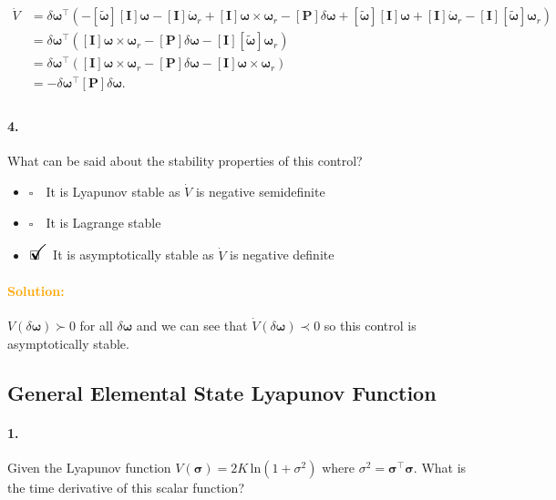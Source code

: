 \documentclass[12pt, a4paper]{article}
\newcommand{\ans}{\item[]$\rlap{\LARGE{\checkmark}}\square\quad$}
\newcommand{\noans}{\item[]$\square\quad$}
\begin{document}
\begin{equation*}
    \begin{split}
        \dot{V}&=\delta\bm{\omega}^{\intercal}(-[\tilde{\bm{\omega}}][\bm{I}]\bm{\omega}-[\bm{I}]\dot{\bm{\omega}}_{r}+[\bm{I}]\bm{\omega}\times\bm{\omega}_{r}-[\bm{P}]\delta\bm{\omega}+[\tilde{\bm{\omega}}][\bm{I}]\bm{\omega}+[\bm{I}]\dot{\bm{\omega}}_{r}-[\bm{I}][\tilde{\bm{\omega}}]\bm{\omega}_{r})\\
        &=\delta\bm{\omega}^{\intercal}([\bm{I}]\bm{\omega}\times\bm{\omega}_{r}-[\bm{P}]\delta\bm{\omega}-[\bm{I}][\tilde{\bm{\omega}}]\bm{\omega}_{r})\\
        &=\delta\bm{\omega}^{\intercal}([\bm{I}]\bm{\omega}\times\bm{\omega}_{r}-[\bm{P}]\delta\bm{\omega}-[\bm{I}]\bm{\omega}\times\bm{\omega}_{r})\\
        &=-\delta\bm{\omega}^{\intercal}[\bm{P}]\delta\bm{\omega}.\\
    \end{split}
\end{equation*}

\paragraph{4.}
What can be said about the stability properties of this control?
\begin{itemize}
\noans It is Lyapunov stable as $\dot{V}$ is negative semidefinite
\noans It is Lagrange stable
\ans It is asymptotically stable as $\dot{V}$ is negative definite 
\end{itemize}

\paragraph{\textcolor{orange}{Solution:}} $V(\delta\bm{\omega})\succ0$ for all $\delta\bm{\bm{\omega}}$ and we can see that $\dot{V}(\delta{\bm{\omega}})\prec0$ so this control is asymptotically stable.

\newpage
\subsection{General Elemental State Lyapunov Function}
\paragraph{1.}
Given the Lyapunov function $V(\bm{\sigma})=2K\,\text{ln}(1+\sigma^{2})$ where $\sigma^{2}=\bm{\sigma}^{\intercal}\bm{\sigma}$. What is the time derivative of this scalar function?
\end{document}
